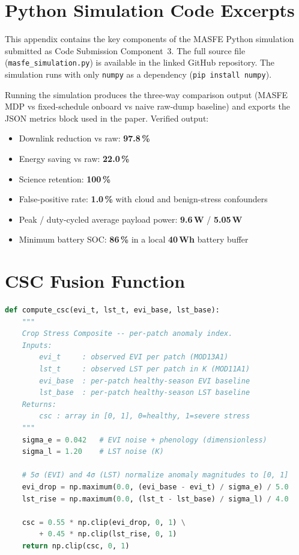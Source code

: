 \section{Python Simulation Code Excerpts}
\label{appendix:code}

This appendix contains the key components of the MASFE Python simulation submitted as Code Submission Component~3. The full source file (\texttt{masfe\_simulation.py}) is available in the linked GitHub repository. The simulation runs with only \texttt{numpy} as a dependency (\texttt{pip install numpy}).

\medskip
\noindent Running the simulation produces the three-way comparison output (MASFE MDP vs fixed-schedule onboard vs naive raw-dump baseline) and exports the JSON metrics block used in the paper. Verified output:

\begin{itemize}
  \item Downlink reduction vs raw: \textbf{97.8\,\%}
  \item Energy saving vs raw: \textbf{22.0\,\%}
  \item Science retention: \textbf{100\,\%}
  \item False-positive rate: \textbf{1.0\,\%} with cloud and benign-stress confounders
  \item Peak / duty-cycled average payload power: \textbf{9.6\,W} / \textbf{5.05\,W}
  \item Minimum battery SOC: \textbf{86\,\%} in a local \textbf{40\,Wh} battery buffer
\end{itemize}

\section*{CSC Fusion Function}

\begin{lstlisting}[language=Python, caption={Onboard Crop Stress Composite (CSC) fusion from MOD13A1 EVI and MOD11A1 LST. Equations correspond to Eq.~\eqref{eq:csc} in the main paper.}]
def compute_csc(evi_t, lst_t, evi_base, lst_base):
    """
    Crop Stress Composite -- per-patch anomaly index.
    Inputs:
        evi_t     : observed EVI per patch (MOD13A1)
        lst_t     : observed LST per patch in K (MOD11A1)
        evi_base  : per-patch healthy-season EVI baseline
        lst_base  : per-patch healthy-season LST baseline
    Returns:
        csc : array in [0, 1], 0=healthy, 1=severe stress
    """
    sigma_e = 0.042   # EVI noise + phenology (dimensionless)
    sigma_l = 1.20    # LST noise (K)

    # 5σ (EVI) and 4σ (LST) normalize anomaly magnitudes to [0, 1]
    evi_drop = np.maximum(0.0, (evi_base - evi_t) / sigma_e) / 5.0
    lst_rise = np.maximum(0.0, (lst_t - lst_base) / sigma_l) / 4.0

    csc = 0.55 * np.clip(evi_drop, 0, 1) \
        + 0.45 * np.clip(lst_rise, 0, 1)
    return np.clip(csc, 0, 1)
\end{lstlisting}


